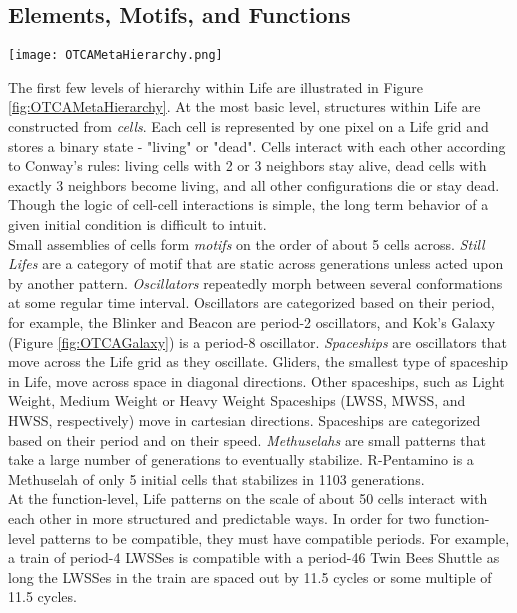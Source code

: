 {\subsection{Elements, Motifs, and Functions}

\begin{sidewaysfigure}
  \texttt{[image: OTCAMetaHierarchy.png]}
  \caption{Hierarchical breakdown of OTCA Metapixel into modules, functions, motifs, and elements.  Complex-level diagram is shown in Figure \ref{fig:OTCADiagram}.}
  \label{fig:OTCAMetaHierarchy}
\end{sidewaysfigure}

The first few levels of hierarchy within Life are illustrated in Figure \ref{fig:OTCAMetaHierarchy}.  At the most basic level, structures within Life are constructed from \textit{cells}.  Each cell is represented by one pixel on a Life grid and stores a binary state - "living" or "dead".  Cells interact with each other according to Conway's rules: living cells with 2 or 3 neighbors stay alive, dead cells with exactly 3 neighbors become living, and all other configurations die or stay dead.  Though the logic of cell-cell interactions is simple, the long term behavior of a given initial condition is difficult to intuit. \\

Small assemblies of cells form \textit{motifs} on the order of about 5 cells across.  \textit{Still Lifes} are a category of motif that are static across generations unless acted upon by another pattern.  \textit{Oscillators} repeatedly morph between several conformations at some regular time interval.  Oscillators are categorized based on their period, for example, the Blinker and Beacon are period-2 oscillators, and Kok's Galaxy (Figure \ref{fig:OTCAGalaxy}) is a period-8 oscillator.  \textit{Spaceships} are oscillators that move across the Life grid as they oscillate.  Gliders, the smallest type of spaceship in Life, move across space in diagonal directions.  Other spaceships, such as Light Weight, Medium Weight or Heavy Weight Spaceships (LWSS, MWSS, and HWSS, respectively) move in cartesian directions.  Spaceships are categorized based on their period and on their speed.  \textit{Methuselahs} are small patterns that take a large number of generations to eventually stabilize.  R-Pentamino is a Methuselah of only 5 initial cells that stabilizes in 1103 generations.\\

At the function-level, Life patterns on the scale of about 50 cells interact with each other in more structured and predictable ways.  In order for two function-level patterns to be compatible, they must have compatible periods.  For example, a train of period-4 LWSSes is compatible with a period-46 Twin Bees Shuttle as long the LWSSes in the train are spaced out by 11.5 cycles or some multiple of 11.5 cycles.\\

}
